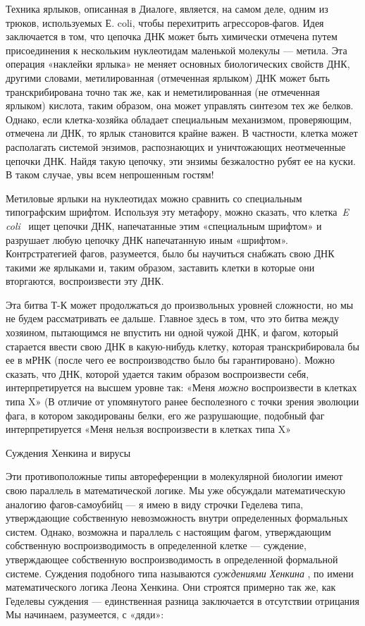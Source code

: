 Техника ярлыков, описанная в Диалоге, является, на самом деле, одним из трюков, используемых Е. coli, чтобы перехитрить агрессоров-фагов. Идея заключается в том, что цепочка ДНК может быть химически отмечена путем присоединения к нескольким нуклеотидам маленькой молекулы --- метила. Эта операция «наклейки ярлыка» не меняет основных биологических свойств ДНК, другими словами, метилированная (отмеченная ярлыком) ДНК может быть транскрибирована точно так же, как и неметилированная (не отмеченная ярлыком) кислота, таким образом, она может управлять синтезом тех же белков. Однако, если клетка-хозяйка обладает специальным механизмом, проверяющим, отмечена ли ДНК, то ярлык становится крайне важен. В частности, клетка может располагать системой энзимов, распознающих и уничтожающих неотмеченные цепочки ДНК. Найдя такую цепочку, эти энзимы безжалостно рубят ее на куски. В таком случае, увы всем непрошенным гостям!

Метиловые ярлыки на нуклеотидах можно сравнить со специальным типографским шрифтом. Используя эту метафору, можно сказать, что клетка~\emph{E coli} ~ищет цепочки ДНК, напечатанные этим «специальным шрифтом» и разрушает любую цепочку ДНК напечатанную иным «шрифтом». Контрстратегией фагов, разумеется, было бы научиться снабжать свою ДНК такими же ярлыками и, таким образом, заставить клетки в которые они вторгаются, воспроизвести эту ДНК.

Эта битва Т-К может продолжаться до произвольных уровней сложности, но мы не будем рассматривать ее дальше. Главное здесь в том, что это битва между хозяином, пытающимся не впустить ни одной чужой ДНК, и фагом, который старается ввести свою ДНК в какую-нибудь клетку, которая транскрибировала бы ее в мРНК (после чего ее воспроизводство было бы гарантировано). Можно сказать, что ДНК, которой удается таким образом воспроизвести себя, интерпретируется на высшем уровне так: «Меня \emph{можно} воспроизвести в клетках типа X» (В отличие от упомянутого ранее бесполезного с точки зрения эволюции фага, в котором закодированы белки, его же разрушающие, подобный фаг интерпретируется «Меня нельзя воспроизвести в клетках типа X»

Суждения Хенкина и вирусы

Эти противоположные типы автореференции в молекулярной биологии имеют свою параллель в математической логике. Мы уже обсуждали математическую аналогию фагов-самоубийц --- я имею в виду строчки Геделева типа, утверждающие собственную невозможность внутри определенных формальных систем. Однако, возможна и параллель с настоящим фагом, утверждающим собственную воспроизводимость в определенной клетке --- суждение, утверждающее собственную воспроизводимость в определенной формальной системе. Суждения подобного типа называются \emph{суждениями Хенкина} , по имени математического логика Леона Хенкина. Они строятся примерно так же, как Геделевы суждения --- единственная разница заключается в отсутствии отрицания Мы начинаем, разумеется, с «дяди»:

